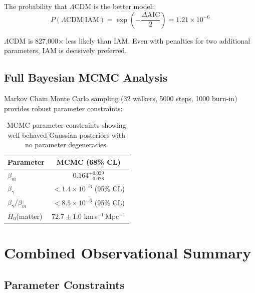 \documentclass[twocolumn,superscriptaddress,prl,amsmath,amssymb]{revtex4-2}
\begin{document}
The probability that $\Lambda$CDM is the better model:
\begin{equation}
P(\Lambda\text{CDM} | \text{IAM}) = \exp\left(-\frac{\Delta\text{AIC}}{2}\right) = 1.21 \times 10^{-6}
\end{equation}

$\Lambda$CDM is 827,000$\times$ less likely than IAM. Even with penalties for two additional parameters, IAM is decisively preferred.

\subsection{Full Bayesian MCMC Analysis}

Markov Chain Monte Carlo sampling (32 walkers, 5000 steps, 1000 burn-in) provides robust parameter constraints:

\begin{table}[h]
\centering
\begin{tabular}{lc}
\hline\hline
Parameter & MCMC (68\% CL) \\
\hline
$\beta_m$ & $0.164^{+0.029}_{-0.028}$ \\
$\beta_\gamma$ & $< 1.4 \times 10^{-6}$ (95\% CL) \\
$\beta_\gamma/\beta_m$ & $< 8.5 \times 10^{-6}$ (95\% CL) \\
$H_0$(matter) & $72.7 \pm 1.0$ km\,s$^{-1}$\,Mpc$^{-1}$ \\
\hline\hline
\end{tabular}
\caption{MCMC parameter constraints showing well-behaved Gaussian posteriors with no parameter degeneracies.}
\end{table}

\section{Combined Observational Summary}

\subsection{Parameter Constraints}
\end{document}
